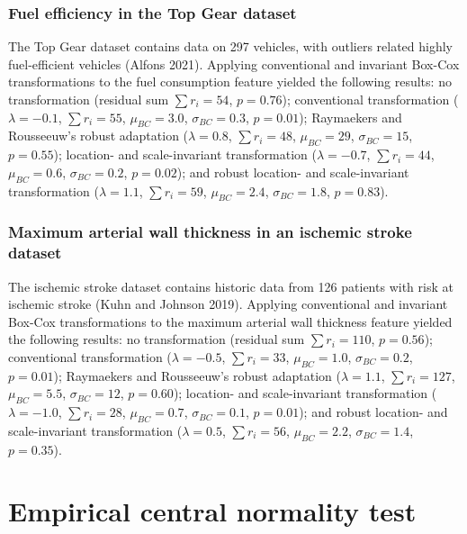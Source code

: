 \documentclass[preprint,12pt,authoryear]{elsarticle}
\begin{document}
\subsubsection{Fuel efficiency in the Top Gear
dataset}\label{fuel-efficiency-in-the-top-gear-dataset}

The Top Gear dataset contains data on 297 vehicles, with outliers
related highly fuel-efficient vehicles (Alfons 2021). Applying
conventional and invariant Box-Cox transformations to the fuel
consumption feature yielded the following results: no transformation
(residual sum \(\sum r_i = 54\), \(p=0.76\)); conventional
transformation (\(\lambda = -0.1\), \(\sum r_i = 55\),
\(\mu_{BC} = 3.0\), \(\sigma_{BC} = 0.3\), \(p=0.01\)); Raymaekers and
Rousseeuw's robust adaptation (\(\lambda = 0.8\), \(\sum r_i = 48\),
\(\mu_{BC} = 29\), \(\sigma_{BC} = 15\), \(p=0.55\)); location- and
scale-invariant transformation (\(\lambda = -0.7\), \(\sum r_i = 44\),
\(\mu_{BC} = 0.6\), \(\sigma_{BC} = 0.2\), \(p=0.02\)); and robust
location- and scale-invariant transformation (\(\lambda = 1.1\),
\(\sum r_i = 59\), \(\mu_{BC} = 2.4\), \(\sigma_{BC} = 1.8\),
\(p=0.83\)).

\subsubsection{Maximum arterial wall thickness in an ischemic stroke
dataset}\label{maximum-arterial-wall-thickness-in-an-ischemic-stroke-dataset}

The ischemic stroke dataset contains historic data from 126 patients
with risk at ischemic stroke (Kuhn and Johnson 2019). Applying
conventional and invariant Box-Cox transformations to the maximum
arterial wall thickness feature yielded the following results: no
transformation (residual sum \(\sum r_i = 110\), \(p=0.56\));
conventional transformation (\(\lambda = -0.5\), \(\sum r_i = 33\),
\(\mu_{BC} = 1.0\), \(\sigma_{BC} = 0.2\), \(p=0.01\)); Raymaekers and
Rousseeuw's robust adaptation (\(\lambda = 1.1\), \(\sum r_i = 127\),
\(\mu_{BC} = 5.5\), \(\sigma_{BC} = 12\), \(p=0.60\)); location- and
scale-invariant transformation (\(\lambda = -1.0\), \(\sum r_i = 28\),
\(\mu_{BC} = 0.7\), \(\sigma_{BC} = 0.1\), \(p=0.01\)); and robust
location- and scale-invariant transformation (\(\lambda = 0.5\),
\(\sum r_i = 56\), \(\mu_{BC} = 2.2\), \(\sigma_{BC} = 1.4\),
\(p=0.35\)).

\section{Empirical central normality test}\label{appendix-e-empirical-central-normality-test}
\end{document}
